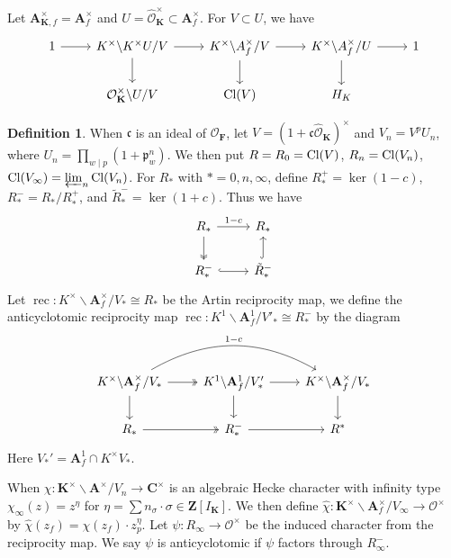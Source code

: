 \documentclass[leqno]{amsart}
\theoremstyle{definition}
\newtheorem{defn}[thm]{Definition}
\theoremstyle{remark}
\newcommand{\oo}{\mathcal{O}}
\newcommand{\Z}{{\mathbf{Z}}}
\newcommand{\C}{\mathbf C}
\newcommand{\A}{\mathbf A}
\DeclareMathOperator{\rec}{rec}
\newcommand{\fc}{\mathfrak{c}}
\newcommand{\fp}{\mathfrak{p}}
\newcommand{\F}{{\mathbf{F}}} %
\newcommand{\K}{{\mathbf{K}}} %
\begin{document}
Let $\A_{\K,f}^\times=\A_f^\times$
and $U=\hat{\oo}_\K^\times\subset \A_f^\times$.
For $V\subset U$, we have
\[
	\begin{tikzcd}
	1\arrow[r]&
	K^\times\backslash K^\times U/V
	\arrow[r] \arrow[d]&
	K^\times\backslash A_f^\times/V
	\arrow[r] \arrow[d]&
	K^\times\backslash A_f^\times/U
	\arrow[r] \arrow[d]&1\\
	   & \oo_\K^\times\backslash U/V&
	   \textnormal{Cl}(V)&
	   H_K&
	\end{tikzcd}
\]
\begin{defn}
When $\fc$ is an ideal of  $\oo_\F$,
let  $V=(1+\fc\hat{\oo}_\K)^\times$
and $V_n=V^pU_n$, where
$U_n=\prod_{w\mid p}(1+\fp_w^n)$.
We then put
$R=R_0=\textnormal{Cl}(V)$,
$R_n=\textnormal{Cl}(V_n)$,
$\textnormal{Cl}(V_\infty)=\varprojlim_n\textnormal{Cl}(V_n)$.
For $R_*$ with  $*=0,n,\infty$,
define 
$R_*^+=\ker(1-c)$,
$R_*^-=R_*/R_*^+$,
and $\tilde{R}_{*}^-=\ker(1+c)$.
Thus we have 
\[
\begin{tikzcd}
	R_* \arrow[r,"1-c"]\arrow[d,twoheadrightarrow]&
	R_*\\
	R_*^- \arrow[r,hookrightarrow] &
	\tilde{R}_*^-\arrow[u,hookrightarrow]
\end{tikzcd}
\]
Let $\rec\colon K^\times\backslash \A_f^\times/V_*\cong R_*$ 
be the Artin reciprocity map, we define 
the anticyclotomic reciprocity map
$\rec\colon K^1\backslash \A_f^1/V'_*\cong R_*^-$
by the diagram
\[
\begin{tikzcd}
K^\times\backslash \A_f^\times/V_*
\arrow[r,twoheadrightarrow] \arrow[d]
\arrow[rr,bend left,"1-c"] &
K^1\backslash \A_f^1/V'_*
\arrow[r] \arrow[d] &
K^\times\backslash \A_f^\times/V_*
\arrow[d]\\
R_* \arrow[r,twoheadrightarrow] &
R_*^- \arrow[r] & R^*
\end{tikzcd}
\]
Here $V_*'=\A_f^1\cap K^\times V_*$.
\end{defn}

When $\chi\colon\K^\times\backslash\A^\times/V_n\to \C^\times$
is an algebraic Hecke character 
with infinity type  $\chi_\infty(z)=z^\eta$
for $\eta=\sum n_\sigma\cdot\sigma\in \Z[I_\K]$.
We then define 
$\hat{\chi}\colon \K^\times\backslash\A_f^\times/V_\infty
\to \oo^\times$ by 
$ \hat{\chi}(z_f)=\chi(z_f)\cdot z_p^\eta$.
Let $\psi\colon R_\infty\to \oo^\times$
be the induced character from the reciprocity map.
We say  $\psi$ is anticyclotomic if
$\psi$ factors through $R_\infty^-$.
\end{document}
